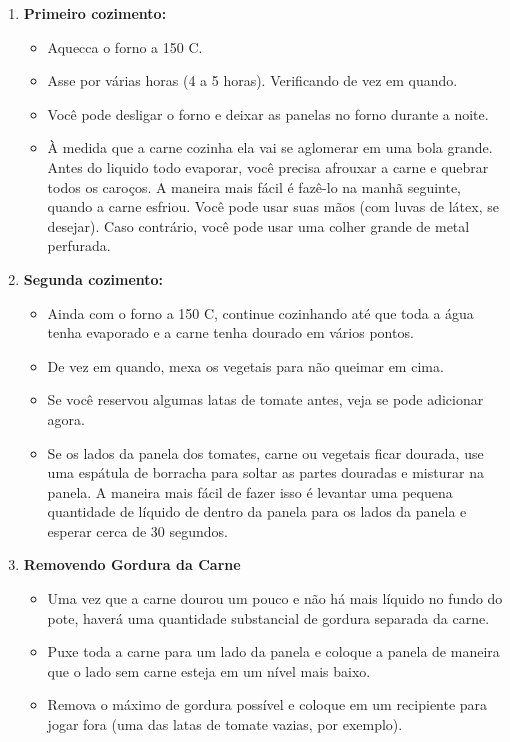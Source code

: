 \documentclass[11pt,letterpaper]{article}
\begin{document}
\begin {description}
\begin {enumerate}
\item {\bf Primeiro cozimento:}
\begin {itemize}
\item Aquec{c}a o forno a 150 C.
\item Asse por várias horas (4 a 5 horas). Verificando de vez em quando.
\item Você pode desligar o forno e deixar as panelas no forno durante a noite.
\item À medida que a carne cozinha ela vai se aglomerar em uma bola grande. Antes do liquido todo evaporar, você precisa afrouxar a carne e quebrar todos os caroços. A maneira mais fácil é fazê-lo na manhã seguinte, quando a carne esfriou. Você pode usar suas mãos (com luvas de látex, se desejar). Caso contrário, você pode usar uma colher grande de metal perfurada.
\end {itemize}
\item {\bf Segunda cozimento:}
\begin {itemize}
\item Ainda com o forno a 150 C, continue cozinhando até que toda a água tenha evaporado e a carne tenha dourado em vários pontos.
\item De vez em quando, mexa os vegetais para n\~ao queimar em cima.
\item Se voc\^e reservou algumas latas de tomate antes, veja se pode adicionar agora.
\item Se os lados da panela dos tomates, carne ou vegetais ficar dourada, use uma espátula de borracha para soltar as partes douradas e misturar na panela. A maneira mais fácil de fazer isso é levantar uma pequena quantidade de líquido de dentro da panela para os lados da panela e esperar cerca de 30 segundos.
\end {itemize}
\item {\bf Removendo Gordura da Carne}
\begin {itemize}
\item Uma vez que a carne dourou um pouco e não há mais líquido no fundo do pote, haverá uma quantidade substancial de gordura separada da carne.
\item Puxe toda a carne para um lado da panela e coloque a panela de maneira que o lado sem carne esteja em um nível mais baixo.
\item Remova o máximo de gordura possível e coloque em um recipiente para jogar fora (uma das latas de tomate vazias, por exemplo).
\end {itemize}


\end{enumerate}
\end{description}
\end{document}
